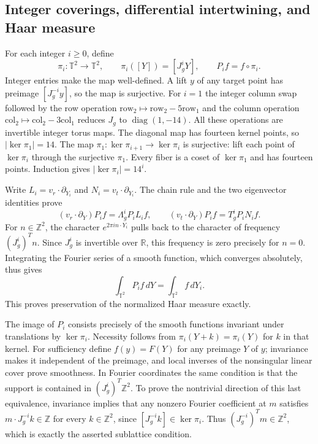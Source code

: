 \documentclass[10pt,a4paper]{article}
\begin{document}
\subsection{Integer coverings, differential intertwining, and Haar measure}
For each integer $i\ge0$, define
\[
 \pi_i:\mathbb T^2\longrightarrow\mathbb T^2,
 \qquad \pi_i([Y])=[J_g^iY],\qquad P_if=f\circ\pi_i.
\]
Integer entries make the map well-defined.  A lift $y$ of any target
point has preimage $[J_g^{-i}y]$, so the map is surjective.  For $i=1$
the integer column swap followed by the row operation
$\mathrm{row}_2\mapsto\mathrm{row}_2-5\mathrm{row}_1$ and the column
operation $\mathrm{col}_2\mapsto\mathrm{col}_2-3\mathrm{col}_1$ reduces
$J_g$ to $\operatorname{diag}(1,-14)$.  All these operations are invertible
integer torus maps.  The diagonal map has fourteen kernel points, so
$|\ker\pi_1|=14$.  The map $\pi_1:\ker\pi_{i+1}\to\ker\pi_i$ is
surjective: lift each point of $\ker\pi_i$ through the surjective
$\pi_1$.  Every fiber is a coset of $\ker\pi_1$ and has fourteen
points.  Induction gives $|\ker\pi_i|=14^i$.

Write $L_i=v_r\cdot\partial_{Y_i}$ and
$N_i=v_t\cdot\partial_{Y_i}$.  The chain rule and the two eigenvector
identities prove
\[
 (v_r\cdot\partial_Y)P_if=\Lambda_g^iP_iL_if,\qquad
 (v_t\cdot\partial_Y)P_if=T_g^iP_iN_if.
\]
For $n\in\mathbb Z^2$, the character $e^{2\pi in\cdot Y_i}$ pulls
back to the character of frequency $(J_g^i)^Tn$.  Since $J_g^i$ is
invertible over $\mathbb R$, this frequency is zero precisely for
$n=0$.  Integrating the Fourier series of a smooth function, which
converges absolutely, thus gives
\[
 \int_{\mathbb T^2}P_if\,dY=\int_{\mathbb T^2}f\,dY_i.
\]
This proves preservation of the normalized Haar measure exactly.

The image of $P_i$ consists precisely of the smooth functions invariant
under translations by $\ker\pi_i$.  Necessity follows from
$\pi_i(Y+k)=\pi_i(Y)$ for $k$ in that kernel.  For sufficiency define
$f(y)=F(Y)$ for any preimage $Y$ of $y$; invariance makes it independent
of the preimage, and local inverses of the nonsingular linear cover
prove smoothness.  In Fourier coordinates the same condition is that
the support is contained in $(J_g^i)^T\mathbb Z^2$.  To prove the
nontrivial direction of this last equivalence, invariance implies that
any nonzero Fourier coefficient at $m$ satisfies
$m\cdot J_g^{-i}k\in\mathbb Z$ for every $k\in\mathbb Z^2$, since
$[J_g^{-i}k]\in\ker\pi_i$.  Thus $(J_g^{-i})^Tm\in\mathbb Z^2$,
which is exactly the asserted sublattice condition.
\end{document}
